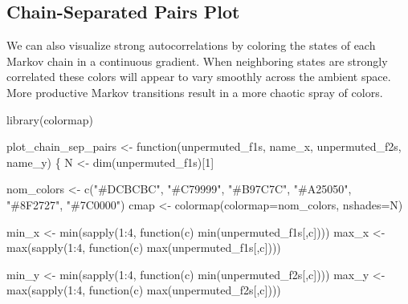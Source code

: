 \documentclass[
  letterpaper,
  DIV=11,
  numbers=noendperiod]{scrartcl}
\newenvironment{Shaded}{\begin{snugshade}}{\end{snugshade}}
\newcommand{\AttributeTok}[1]{\textcolor[rgb]{0.40,0.45,0.13}{#1}}
\newcommand{\ControlFlowTok}[1]{\textcolor[rgb]{0.00,0.23,0.31}{#1}}
\newcommand{\DecValTok}[1]{\textcolor[rgb]{0.68,0.00,0.00}{#1}}
\newcommand{\FunctionTok}[1]{\textcolor[rgb]{0.28,0.35,0.67}{#1}}
\newcommand{\NormalTok}[1]{\textcolor[rgb]{0.00,0.23,0.31}{#1}}
\newcommand{\OtherTok}[1]{\textcolor[rgb]{0.00,0.23,0.31}{#1}}
\newcommand{\SpecialCharTok}[1]{\textcolor[rgb]{0.37,0.37,0.37}{#1}}
\newcommand{\StringTok}[1]{\textcolor[rgb]{0.13,0.47,0.30}{#1}}
\begin{document}
\hypertarget{chain-separated-pairs-plot}{%
\subsection{Chain-Separated Pairs
Plot}\label{chain-separated-pairs-plot}}

We can also visualize strong autocorrelations by coloring the states of
each Markov chain in a continuous gradient. When neighboring states are
strongly correlated these colors will appear to vary smoothly across the
ambient space. More productive Markov transitions result in a more
chaotic spray of colors.

\begin{Shaded}
\begin{Highlighting}[]
\FunctionTok{library}\NormalTok{(colormap)}

\NormalTok{plot\_chain\_sep\_pairs }\OtherTok{\textless{}{-}} \ControlFlowTok{function}\NormalTok{(unpermuted\_f1s, name\_x,}
\NormalTok{                                 unpermuted\_f2s, name\_y) \{}
\NormalTok{  N }\OtherTok{\textless{}{-}} \FunctionTok{dim}\NormalTok{(unpermuted\_f1s)[}\DecValTok{1}\NormalTok{]}

\NormalTok{  nom\_colors }\OtherTok{\textless{}{-}} \FunctionTok{c}\NormalTok{(}\StringTok{"\#DCBCBC"}\NormalTok{, }\StringTok{"\#C79999"}\NormalTok{, }\StringTok{"\#B97C7C"}\NormalTok{,}
                  \StringTok{"\#A25050"}\NormalTok{, }\StringTok{"\#8F2727"}\NormalTok{, }\StringTok{"\#7C0000"}\NormalTok{)}
\NormalTok{  cmap }\OtherTok{\textless{}{-}} \FunctionTok{colormap}\NormalTok{(}\AttributeTok{colormap=}\NormalTok{nom\_colors, }\AttributeTok{nshades=}\NormalTok{N)}

\NormalTok{  min\_x }\OtherTok{\textless{}{-}} \FunctionTok{min}\NormalTok{(}\FunctionTok{sapply}\NormalTok{(}\DecValTok{1}\SpecialCharTok{:}\DecValTok{4}\NormalTok{, }\ControlFlowTok{function}\NormalTok{(c) }\FunctionTok{min}\NormalTok{(unpermuted\_f1s[,c])))}
\NormalTok{  max\_x }\OtherTok{\textless{}{-}} \FunctionTok{max}\NormalTok{(}\FunctionTok{sapply}\NormalTok{(}\DecValTok{1}\SpecialCharTok{:}\DecValTok{4}\NormalTok{, }\ControlFlowTok{function}\NormalTok{(c) }\FunctionTok{max}\NormalTok{(unpermuted\_f1s[,c])))}

\NormalTok{  min\_y }\OtherTok{\textless{}{-}} \FunctionTok{min}\NormalTok{(}\FunctionTok{sapply}\NormalTok{(}\DecValTok{1}\SpecialCharTok{:}\DecValTok{4}\NormalTok{, }\ControlFlowTok{function}\NormalTok{(c) }\FunctionTok{min}\NormalTok{(unpermuted\_f2s[,c])))}
\NormalTok{  max\_y }\OtherTok{\textless{}{-}} \FunctionTok{max}\NormalTok{(}\FunctionTok{sapply}\NormalTok{(}\DecValTok{1}\SpecialCharTok{:}\DecValTok{4}\NormalTok{, }\ControlFlowTok{function}\NormalTok{(c) }\FunctionTok{max}\NormalTok{(unpermuted\_f2s[,c])))}


\end{Highlighting}
\end{Shaded}
\end{document}
